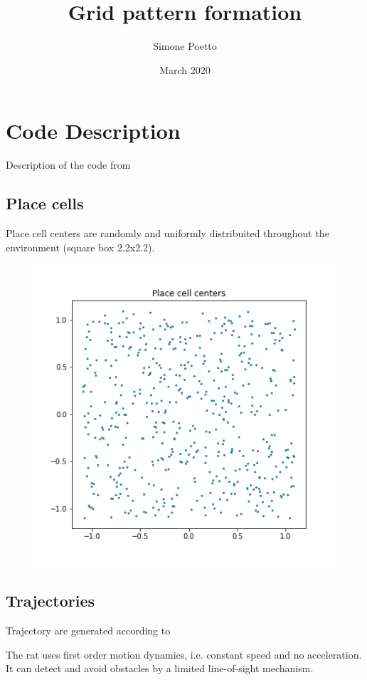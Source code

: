 \documentclass{article}
\title{Grid pattern formation}
\author{Simone Poetto}
\date{March 2020}
\begin{document}
\maketitle

\section{Code Description}
Description of the code from \cite{Sorscher}
\subsection{Place cells}

Place cell centers are randomly and uniformly distribuited throughout the environment (square box 2.2x2.2).

\begin{figure}[H]
\centering
\includegraphics[scale=0.6]{images/place_cell_centers.png}
\label{placecells}
\end{figure}

\bigskip

\subsection{Trajectories}
Trajectory are generated according to \cite{traj}

The rat uses first order motion dynamics, i.e. constant speed and no acceleration. It can detect and avoid obstacles by a limited line-of-sight mechanism.
\end{document}
